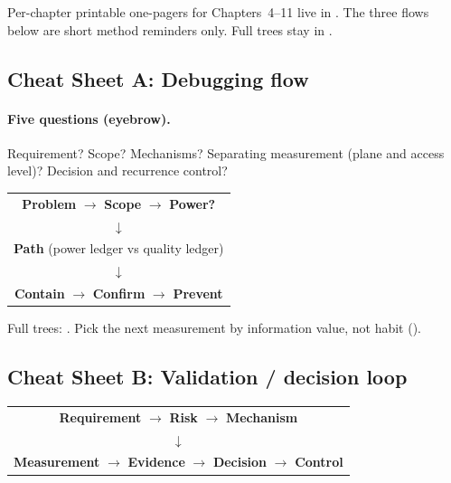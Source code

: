 Per-chapter printable one-pagers for Chapters~4--11 live in
. The three flows below are short method
reminders only. Full trees stay in .

\subsection{Cheat Sheet A: Debugging flow}
\label{sec:cheat-debug}

\paragraph{Five questions (eyebrow).}
Requirement? Scope? Mechanisms? Separating measurement (plane and access
level)? Decision and recurrence control?

\begin{center}
\small
\begin{tabular}{@{}c@{}}
\textbf{Problem} $\rightarrow$ \textbf{Scope} $\rightarrow$ \textbf{Power?} \\[0.4em]
$\downarrow$ \\[0.2em]
\textbf{Path} (power ledger vs quality ledger) \\[0.4em]
$\downarrow$ \\[0.2em]
\textbf{Contain} $\rightarrow$ \textbf{Confirm} $\rightarrow$ \textbf{Prevent}
\end{tabular}
\end{center}

Full trees: . Pick the next
measurement by information value, not habit
().

\clearpage
\subsection{Cheat Sheet B: Validation / decision loop}
\label{sec:cheat-validation}

\begin{center}
\small
\begin{tabular}{@{}c@{}}
\textbf{Requirement} $\rightarrow$ \textbf{Risk} $\rightarrow$ \textbf{Mechanism} \\[0.4em]
$\downarrow$ \\[0.2em]
\textbf{Measurement} $\rightarrow$ \textbf{Evidence} $\rightarrow$
\textbf{Decision} $\rightarrow$ \textbf{Control}
\end{tabular}
\end{center}

